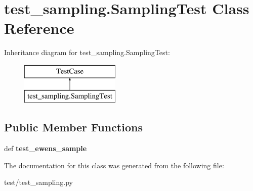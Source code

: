 \hypertarget{classtest__sampling_1_1_sampling_test}{\section{test\-\_\-sampling.\-Sampling\-Test Class Reference}
\label{classtest__sampling_1_1_sampling_test}
}
Inheritance diagram for test\-\_\-sampling.\-Sampling\-Test\-:\begin{figure}[H]
\begin{center}
\leavevmode
\includegraphics[height=2.000000cm]{classtest__sampling_1_1_sampling_test}
\end{center}
\end{figure}
\subsection*{Public Member Functions}
\begin{DoxyCompactItemize}
\item 
\hypertarget{classtest__sampling_1_1_sampling_test_a6f817a84e2cea300d82d21afea82dbd3}{def {\bfseries test\-\_\-ewens\-\_\-sample}}\label{classtest__sampling_1_1_sampling_test_a6f817a84e2cea300d82d21afea82dbd3}

\end{DoxyCompactItemize}


The documentation for this class was generated from the following file\-:\begin{DoxyCompactItemize}
\item 
test/test\-\_\-sampling.\-py\end{DoxyCompactItemize}
